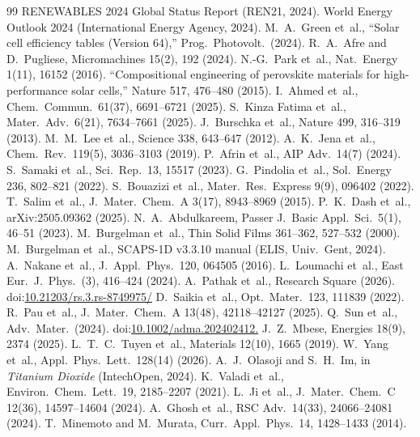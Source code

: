 \documentclass[review]{elsarticle}
\begin{document}
\begin{thebibliography}{99}
 RENEWABLES 2024 Global Status Report (REN21, 2024).
 World Energy Outlook 2024 (International Energy Agency, 2024).
 M.~A.~Green et~al., ``Solar cell efficiency tables (Version 64),'' Prog.\ Photovolt.\ (2024).
 R.~A.~Afre and D.~Pugliese, Micromachines 15(2), 192 (2024).
 N.-G.~Park et~al., Nat.\ Energy 1(11), 16152 (2016).
 ``Compositional engineering of perovskite materials for high-performance solar cells,'' Nature 517, 476--480 (2015).
 I.~Ahmed et~al., Chem.\ Commun.\ 61(37), 6691--6721 (2025).
 S.~Kinza Fatima et~al., Mater.\ Adv.\ 6(21), 7634--7661 (2025).
 J.~Burschka et~al., Nature 499, 316--319 (2013).
 M.~M.~Lee et~al., Science 338, 643--647 (2012).
 A.~K.~Jena et~al., Chem.\ Rev.\ 119(5), 3036--3103 (2019).
 P.~Afrin et~al., AIP Adv.\ 14(7) (2024).
 S.~Samaki et~al., Sci.\ Rep.\ 13, 15517 (2023).
 G.~Pindolia et~al., Sol.\ Energy 236, 802--821 (2022).
 S.~Bouazizi et~al., Mater.\ Res.\ Express 9(9), 096402 (2022).
 T.~Salim et~al., J.\ Mater.\ Chem.\ A 3(17), 8943--8969 (2015).
 P.~K.~Dash et~al., arXiv:2505.09362 (2025).
 N.~A.~Abdulkareem, Passer J.\ Basic Appl.\ Sci.\ 5(1), 46--51 (2023).
 M.~Burgelman et~al., Thin Solid Films 361--362, 527--532 (2000).
 M.~Burgelman et~al., SCAPS-1D v3.3.10 manual (ELIS, Univ.\ Gent, 2024).
 A.~Nakane et~al., J.\ Appl.\ Phys.\ 120, 064505 (2016).
 L.~Loumachi et~al., East Eur.\ J.\ Phys.\ (3), 416--424 (2024).
 A.~Pathak et~al., Research Square (2026). doi:\url{10.21203/rs.3.rs-8749975/}
 D.~Saikia et~al., Opt.\ Mater.\ 123, 111839 (2022).
 R.~Pau et~al., J.\ Mater.\ Chem.\ A 13(48), 42118--42127 (2025).
 Q.~Sun et~al., Adv.\ Mater.\ (2024). doi:\url{10.1002/adma.202402412.}
 J.~Z.~Mbese, Energies 18(9), 2374 (2025).
 L.~T.~C.~Tuyen et~al., Materials 12(10), 1665 (2019).
 W.~Yang et~al., Appl.\ Phys.\ Lett.\ 128(14) (2026).
 A.~J.~Olasoji and S.~H.~Im, in \textit{Titanium Dioxide} (IntechOpen, 2024).
 K.~Valadi et~al., Environ.\ Chem.\ Lett.\ 19, 2185--2207 (2021).
 L.~Ji et~al., J.\ Mater.\ Chem.\ C 12(36), 14597--14604 (2024).
 A.~Ghosh et~al., RSC Adv.\ 14(33), 24066--24081 (2024).
 T.~Minemoto and M.~Murata, Curr.\ Appl.\ Phys.\ 14, 1428--1433 (2014).

\end{thebibliography}
\end{document}
